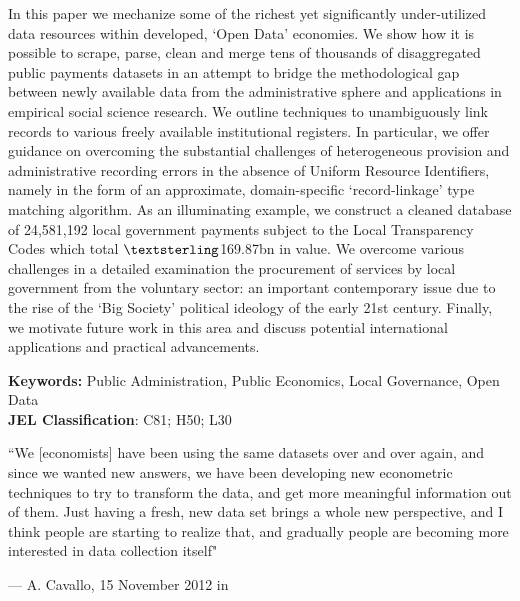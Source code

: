 \documentclass[11pt]{article}
\renewenvironment{abstract}
 {   \linespread{1.2}\selectfont
  \begin{center}
  \bfseries \abstractname\vspace{-.5em}\vspace{0pt}
  \end{center}
  \list{}{%
    \setlength{\leftmargin}{-2.5mm}%
    \setlength{\rightmargin}{\leftmargin}%
  }%
  \item\relax}
 {\endlist}
\begin{document}
\begin{center}
\begin{abstract}
\color{black}
In this paper we mechanize some of the richest yet significantly under-utilized data resources within developed, `Open Data' economies. We show how it is possible to scrape, parse, clean and merge tens of thousands of disaggregated public payments datasets in an attempt to bridge the methodological gap between newly available data from the administrative sphere and applications in empirical social science research. We outline techniques to unambiguously link records to various freely available institutional registers. In particular, we offer guidance on overcoming the substantial challenges of heterogeneous provision and administrative recording errors in the absence of Uniform Resource Identifiers, namely in the form of an approximate, domain-specific `record-linkage' type matching algorithm. As an illuminating example, we construct a cleaned database of 24,581,192 local government payments subject to the Local Transparency Codes which total $\textsterling$169.87bn in value. We overcome various challenges in a detailed examination the procurement of services by local government from the voluntary sector: an important contemporary issue due to the rise of the ‘Big Society’ political ideology of the early 21st century.  Finally, we motivate future work in this area and discuss potential international applications and practical advancements.
\normalsize
\end{abstract}
\end{center}
\noindent
\textbf{Keywords:} Public Administration, Public Economics, Local Governance, Open Data\\
\noindent  
\textbf{JEL Classification}:  C81; H50; L30\\
\newpage
\normalsize
\renewcommand*{\thefootnote}{\arabic{footnote}}
\setlength{\epigraphwidth}{.6\textwidth}
\epigraph{``We [economists] have been using the same datasets over and over again, and since we wanted new answers, we have been developing new econometric techniques to try to transform the data, and get more meaningful information out of them. Just having a fresh, new data set brings a whole new perspective, and I think people are starting to realize that, and gradually people are becoming more interested in data collection itself"}{--- \textup{A. Cavallo, 15 November 2012 in \cite{taylor}}}
\end{document}
